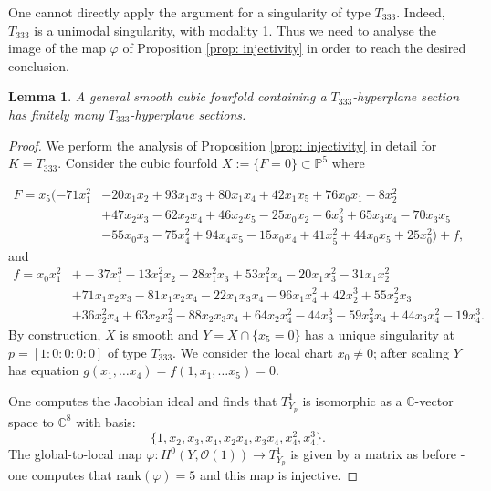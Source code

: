 \documentclass[12pt]{amsart}
\numberwithin{equation}{section}
\theoremstyle{plain}
\newtheorem{lemma}[equation]{Lemma}
\theoremstyle{remark}
\theoremstyle{definition}
\newcommand{\bP}{\mathbb{P}}
\newcommand{\bC}{\mathbb{C}}
\newcommand{\calO}{\mathcal{O}}
\newcommand{\rank}{\mathrm{rank}}
\begin{document}
One cannot directly apply the argument for a singularity of type $T_{333}$. Indeed, $T_{333}$ is a unimodal singularity, with modality 1. Thus we need to analyse the image of the map $\varphi$ of Proposition \ref{prop: injectivity} in order to reach the desired conclusion.

\begin{lemma}\label{lemma: T333}
    A general smooth cubic fourfold containing a $T_{333}$-hyperplane section has finitely many $T_{333}$-hyperplane sections.
\end{lemma}
\begin{proof}
    We perform the analysis of Proposition \ref{prop: injectivity} in detail for $K=T_{333}.$ Consider the cubic fourfold $X:=\{F=0\}\subset \bP^5$ where

    \begin{equation*}
\begin{split}
    F=  x_5(- 71x_1^2 &- 20x_1x_2  + 93x_1x_3  + 80x_1x_4 + 42x_1x_5
    + 76x_0x_1- 8x_2^2  \\
    &+ 47x_2x_3 - 62x_2x_4+ 46x_2x_5 - 25x_0x_2  - 6x_3^2 + 65x_3x_4 - 70x_3x_5  \\
    & - 55x_0x_3 - 75x_4^2+ 94x_4x_5 - 15x_0x_4 + 41x_5^2 
    + 44x_0x_5 + 25x_0^2)+ f,
\end{split}
\end{equation*}
and 
\begin{equation*}
    \begin{split}
        f= x_0x_1^2 &+ -37x_1^3 - 13x_1^2x_2 - 28x_1^2x_3 + 53x_1^2x_4 - 20x_1x_3^2 - 31x_1x_2^2 \\
        &+ 71x_1x_2x_3 - 81x_1x_2x_4- 22x_1x_3x_4- 96x_1x_4^2 + 42x_2^3 + 55x_2^2x_3  \\
        &+ 36x_2^2x_4+ 63x_2x_3^2- 88x_2x_3x_4+ 64x_2x_4^2- 44x_3^3 - 59x_3^2x_4+ 44x_3x_4^2 - 19x_4^3.
        \end{split}
\end{equation*}
By construction, $X$ is smooth and $Y=X\cap\{x_5=0\}$ has a unique singularity at $p=[1:0:0:0:0]$ of type $T_{333}$.
We consider the local chart $x_0\neq 0$; after scaling $Y$ has equation $g(x_1,\dots x_4)=f(1,x_1,\dots x_5)=0.$

One computes the Jacobian ideal and finds that $T^1_{Y_p}$ is isomorphic as a $\bC$-vector space to $\bC^8$ with basis:
$$\{1, x_2, x_3, x_4, x_2x_4, x_3x_4, x_4^2, x_4^3\}.$$
The global-to-local map $\varphi:H^0(Y,\calO(1))\rightarrow T^1_{Y_p}$ is given by a matrix as before - one computes that $\rank(\varphi)=5$ and this map is injective.


\end{proof}
\end{document}
